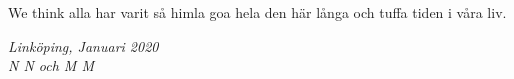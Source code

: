 \begin{acknowledgments}
  We think alla har varit så himla goa hela den här långa och tuffa tiden i våra liv.

  \addvspace{1em}
  \begin{flushright}
    \textit{%
      Linköping, Januari 2020\\
      N N och M M%
    }
  \end{flushright}
\end{acknowledgments}
